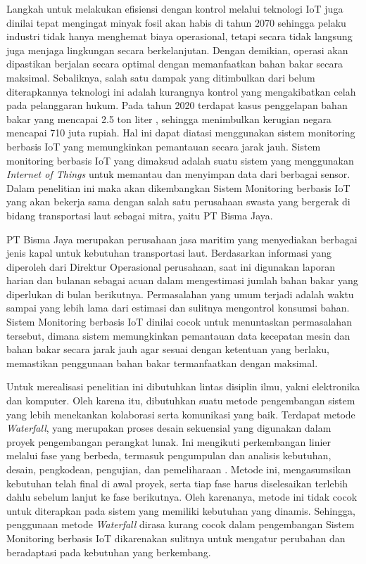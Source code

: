 Langkah untuk melakukan efisiensi dengan kontrol melalui teknologi IoT juga dinilai tepat mengingat minyak fosil akan habis di tahun 2070 \parencite{misc:bp} sehingga pelaku industri tidak hanya menghemat biaya operasional, tetapi secara tidak langsung juga menjaga lingkungan secara berkelanjutan. Dengan demikian, operasi akan dipastikan berjalan secara optimal dengan memanfaatkan bahan bakar secara maksimal. Sebaliknya, salah satu dampak yang ditimbulkan dari belum diterapkannya teknologi ini adalah kurangnya kontrol yang mengakibatkan celah pada pelanggaran hukum. Pada tahun 2020 terdapat kasus penggelapan bahan bakar yang mencapai 2.5 ton liter \parencite{misc:aditya}, sehingga menimbulkan kerugian negara mencapai 710 juta rupiah. Hal ini dapat diatasi menggunakan sistem monitoring berbasis IoT yang memungkinkan pemantauan secara jarak jauh. Sistem monitoring berbasis IoT yang dimaksud adalah suatu sistem yang menggunakan \textit{Internet of Things} untuk memantau dan menyimpan data dari berbagai sensor. Dalam penelitian ini maka akan dikembangkan Sistem Monitoring berbasis IoT yang akan bekerja sama dengan salah satu perusahaan swasta yang bergerak di bidang transportasi laut sebagai mitra, yaitu PT Bisma Jaya.

PT Bisma Jaya merupakan perusahaan jasa maritim yang menyediakan berbagai jenis kapal untuk kebutuhan transportasi laut. Berdasarkan informasi yang diperoleh dari Direktur Operasional perusahaan, saat ini digunakan laporan harian dan bulanan sebagai acuan dalam mengestimasi jumlah bahan bakar yang diperlukan di bulan berikutnya. Permasalahan yang umum terjadi adalah waktu sampai yang lebih lama dari estimasi dan sulitnya mengontrol konsumsi bahan. Sistem Monitoring berbasis IoT dinilai cocok untuk menuntaskan permasalahan tersebut, dimana sistem memungkinkan pemantauan data kecepatan mesin dan bahan bakar secara jarak jauh agar sesuai dengan ketentuan yang berlaku, memastikan penggunaan bahan bakar termanfaatkan dengan maksimal.

Untuk merealisasi penelitian ini dibutuhkan lintas disiplin ilmu, yakni elektronika dan komputer. Oleh karena itu, dibutuhkan suatu metode pengembangan sistem yang lebih menekankan kolaborasi serta komunikasi yang baik. Terdapat metode \textit{Waterfall}, yang merupakan proses desain sekuensial yang digunakan dalam proyek pengembangan perangkat lunak. Ini mengikuti perkembangan linier melalui fase yang berbeda, termasuk pengumpulan dan analisis kebutuhan, desain, pengkodean, pengujian, dan pemeliharaan \parencite{article:abbas}. Metode ini, mengasumsikan kebutuhan telah final di awal proyek, serta tiap fase harus diselesaikan terlebih dahlu sebelum lanjut ke fase berikutnya. Oleh karenanya, metode ini tidak cocok untuk diterapkan pada sistem yang memiliki kebutuhan yang dinamis. Sehingga, penggunaan metode \textit{Waterfall} dirasa kurang cocok dalam pengembangan Sistem Monitoring berbasis IoT dikarenakan sulitnya untuk mengatur perubahan dan beradaptasi pada kebutuhan yang berkembang.

